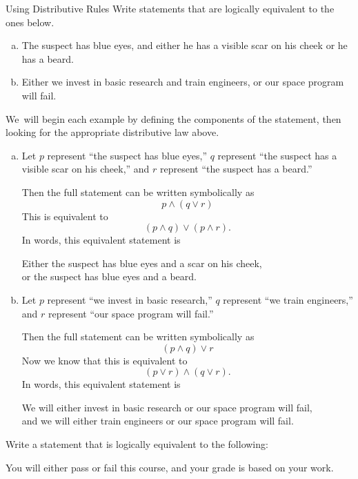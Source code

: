 \begin{example}[https://www.youtube.com/watch?v=-OWBz6l9ZzQ]{Using Distributive Rules}
Write statements that are logically equivalent to the ones below.
\begin{enumerate}[(a)]
\item The suspect has blue eyes, and either he has a visible scar on his cheek or he has a beard.
\item Either we invest in basic research and train engineers, or our space program will fail.
\end{enumerate}

We\sol\ will begin each example by defining the components of the statement, then looking for the appropriate distributive law above.
\begin{enumerate}[(a)]
\item Let $p$ represent ``the suspect has blue eyes,'' $q$ represent ``the suspect has a visible scar on his cheek,'' and $r$ represent ``the suspect has a beard.''

Then the full statement can be written symbolically as
\[p \wedge (q \vee r)\]
This is equivalent to \[(p \wedge q) \vee (p \wedge r).\]
In words, this equivalent statement is 
\begin{center}
Either the suspect has blue eyes and a scar on his cheek,\\ or the suspect has blue eyes and a beard.
\end{center}
\item Let $p$ represent ``we invest in basic research,'' $q$ represent ``we train engineers,'' and $r$ represent ``our space program will fail.''

Then the full statement can be written symbolically as
\[(p \wedge q) \vee r\]
Now we know that this is equivalent to \[(p \vee r) \wedge (q \vee r).\]
In words, this equivalent statement is 
\begin{center}
We will either invest in basic research or our space program will fail,\\ and we will either train engineers or our space program will fail.
\end{center}
\end{enumerate}
\end{example}

\begin{try}
Write a statement that is logically equivalent to the following:
\begin{center}
You will either pass or fail this course, and your grade is based on your work.
\end{center}
\end{try}

